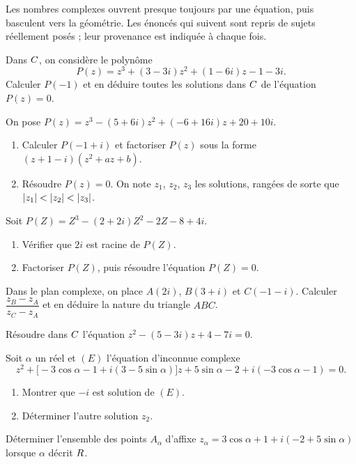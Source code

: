 \begin{annales}
Les nombres complexes ouvrent presque toujours par une équation, puis
basculent vers la géométrie. Les énoncés qui suivent sont repris de sujets
réellement posés ; leur provenance est indiquée à chaque fois.

Dans $C$, on considère le polynôme
\[
  P(z) = z^{3}+(3-3i)z^{2}+(1-6i)z-1-3i .
\]
Calculer $P(-1)$ et en déduire toutes les solutions dans $C$ de l'équation
$P(z) = 0$.

On pose $P(z) = z^{3}-(5+6i)z^{2}+(-6+16i)z+20+10i$.
\begin{enumerate}[label=\textbf{\arabic*)}, leftmargin=*, itemsep=0.15em]
  \item Calculer $P(-1+i)$ et factoriser $P(z)$ sous la forme
        $(z+1-i)\left(z^{2}+az+b\right)$.
  \item Résoudre $P(z) = 0$. On note $z_{1}$, $z_{2}$, $z_{3}$ les solutions,
        rangées de sorte que $\left|z_{1}\right|<\left|z_{2}\right|<\left|z_{3}\right|$.
\end{enumerate}

Soit $P(Z) = Z^{3}-(2+2i)Z^{2}-2Z-8+4i$.
\begin{enumerate}[label=\textbf{\arabic*)}, leftmargin=*, itemsep=0.15em]
  \item Vérifier que $2i$ est racine de $P(Z)$.
  \item Factoriser $P(Z)$, puis résoudre l'équation $P(Z) = 0$.
\end{enumerate}

Dans le plan complexe, on place $A(2i)$, $B(3+i)$ et $C(-1-i)$. Calculer
$\dfrac{z_{B}-z_{A}}{z_{C}-z_{A}}$ et en déduire la nature du triangle $ABC$.

Résoudre dans $C$ l'équation
$z^{2}-(5-3i)z+4-7i = 0$.

Soit $\alpha$ un réel et $(E)$ l'équation d'inconnue complexe
\[
  z^{2}+\bigl[-3\cos\alpha-1+i(3-5\sin\alpha)\bigr]z
  +5\sin\alpha-2+i(-3\cos\alpha-1) = 0 .
\]
\begin{enumerate}[label=\textbf{\arabic*)}, leftmargin=*, itemsep=0.15em]
  \item Montrer que $-i$ est solution de $(E)$.
  \item Déterminer l'autre solution $z_{2}$.
\end{enumerate}

Déterminer l'ensemble des points $A_{\alpha}$ d'affixe
$z_{\alpha} = 3\cos\alpha+1+i\left(-2+5\sin\alpha\right)$ lorsque $\alpha$
décrit $R$.
\end{annales}

